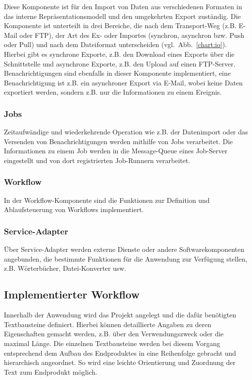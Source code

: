 Diese Komponente ist für den Import von Daten aus verschiedenen Formaten in das interne Repräsentationsmodell und den umgekehrten Export zuständig. Die Komponente ist unterteilt in drei Bereiche, die nach dem Transport-Weg (z.B. E-Mail oder FTP), der Art des Ex- oder Importes (synchron, asynchron bzw. Push oder Pull) und nach dem Dateiformat unterscheiden (vgl.~Abb.~\ref{chart:io}).  Hierbei gibt es synchrone Exporte, z.B. den Download eines Exports über die Schnittstelle und asynchrone Exporte, z.B. den Upload auf einen FTP-Server. Benachrichtigungen sind ebenfalls in dieser Komponente implementiert, eine Benachrichtigung ist z.B. ein asynchroner Export via E-Mail, wobei keine Daten exportiert werden, sondern z.B. nur die Informationen zu einem Ereignis.

\subsubsection{Jobs}

Zeitaufwändige und wiederkehrende Operation wie z.B. der Datenimport oder das Versenden von Benachrichtigungen werden mithilfe von Jobs verarbeitet. Die Informationen zu einem Job werden in die Message-Queue eines Job-Server eingestellt und von dort registrierten Job-Runnern verarbeitet.

\subsubsection{Workflow}

In der Workflow-Komponente sind die Funktionen zur Definition und Ablaufsteuerung von Workflows implementiert.

\subsubsection{Service-Adapter}

Über Service-Adapter werden externe Dienste oder andere Softwarekomponenten angebunden, die bestimmte Funktionen für die Anwendung zur Verfügung stellen, z.B. Wörterbücher, Datei-Konverter usw.



\subsection{Implementierter Workflow}

Innerhalb der Anwendung wird das Projekt angelegt und die dafür benötigten Textbausteine definiert. Hierbei können detaillierte Angaben zu deren Eigenschaften gemacht werden, z.B. über den Verwendungszweck oder die maximal Länge. Die einzelnen Textbausteine werden bei diesem Vorgang entsprechend dem Aufbau des Endproduktes in eine Reihenfolge gebracht und hierarchisch angeordnet. So wird eine leichte Orientierung und Zuordnung der Text zum Endprodukt möglich. 

